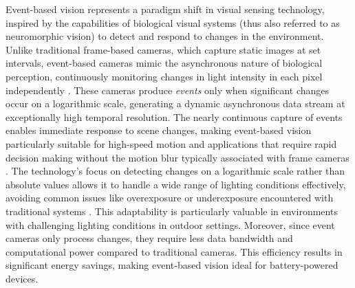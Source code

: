 \documentclass{article}
\begin{document}
Event-based vision represents a paradigm shift in visual sensing technology, inspired by the capabilities of biological visual systems (thus also referred to as neuromorphic vision) to detect and respond to changes in the environment. Unlike traditional frame-based cameras, which capture static images at set intervals, event-based cameras mimic the asynchronous nature of biological perception, continuously monitoring changes in light intensity in each pixel independently \cite{chakravarthiRecentEventCamera2024}. These cameras produce \textit{events} only when significant changes occur on a logarithmic scale, generating a dynamic asynchronous data stream at exceptionally high temporal resolution. The nearly continuous capture of events enables immediate response to scene changes, making event-based vision particularly suitable for high-speed motion and applications that require rapid decision making without the motion blur typically associated with frame cameras \cite{DenseContinuousTimeOptical, gehrigERAFTDenseOptical2021, forraiEventbasedAgileObject2023, jiangFullyAsynchronousNeuromorphic2024, vidalUltimateSLAMCombining2018, falangaDynamicObstacleAvoidance2020}. The technology’s focus on detecting changes on a logarithmic scale rather than absolute values allows it to handle a wide range of lighting conditions effectively, avoiding common issues like overexposure or underexposure encountered with traditional systems \cite{gallegoEventbasedVisionSurvey2022, gehrigLowlatencyAutomotiveVision2024}. This adaptability is particularly valuable in environments with challenging lighting conditions in outdoor settings. Moreover, since event cameras only process changes, they require less data bandwidth and computational power compared to traditional cameras. This efficiency results in significant energy savings, making event-based vision ideal for battery-powered devices. 
\end{document}
